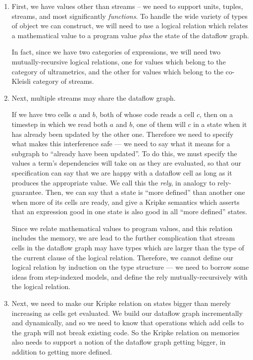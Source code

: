 \documentclass[preprint]{sigplanconf}
\begin{document}
\begin{enumerate}

\item First, we have values other than streams -- we need to support
  units, tuples, streams, and most significantly \emph{functions}.
  To handle the wide variety of types of object we can construct, we
  will need to use a logical relation which relates a mathematical
  value to a program value \emph{plus} the state of the dataflow 
  graph. 

  In fact, since we have two categories of expressions, we will need
  two mutually-recursive logical relations, one for values which
  belong to the category of ultrametrics, and the other for values
  which belong to the co-Kleisli category of streams.

\item Next, multiple streams may share the dataflow graph.

  If we have two cells $a$ and $b$, both of whose code reads a cell
  $c$, then on a timestep in which we read both $a$ and $b$, one of
  them will $c$ in a state when it has already been updated by the
  other one. Therefore we need to specify what makes this interference
  safe --- we need to say what it means for a subgraph to ``already
  have been updated''. To do this, we must specify the values a term's
  dependencies will take on as they are evaluated, so that our
  specification can say that we are happy with a dataflow cell as long
  as it produces the appropriate value. We call this the \emph{rely},
  in analogy to rely-guarantee. Then, we can say that a state is
  ``more defined'' than another one when more of its cells are ready,
  and give a Kripke semantics which asserts that an expression good in
  one state is also good in all ``more defined'' states.

  Since we relate mathematical values to program values, and this
  relation includes the memory, we are lead to the further
  complication that stream cells in the dataflow graph may have types
  which are larger than the type of the current clause of the logical
  relation. Therefore, we cannot define our logical relation by
  induction on the type structure --- we need to borrow some ideas
  from step-indexed models, and define the rely mutually-recursively
  with the logical relation.

\item Next, we need to make our Kripke relation on states bigger than
  merely increasing as cells get evaluated. We build our dataflow
  graph incrementally and dynamically, and so we need to know that
  operations which add cells to the graph will not break existing
  code. So the Kripke relation on memories also needs to support a
  notion of the dataflow graph getting bigger, in addition to 
  getting more defined. 


\end{enumerate}
\end{document}
